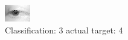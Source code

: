 \begin{figure}[h!]
\begin{center}
\includegraphics[width=0.60\columnwidth]{figures/ID2589_class_3_target_4.png}
\end{center}
\caption{ Classification: 3 actual target: 4}
\label{fig:ID2589_class_3_target_4}
\end{figure}
